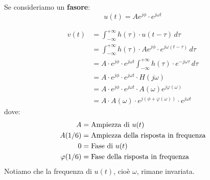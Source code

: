 \documentclass[a4paper]{article}
\begin{document}
\begin{example}
  Se consideriamo un \textbf{fasore}:
  \[
    u(t) = A e^{j \phi} \cdot  e^{j \omega t}
  \] 
  \begin{figure}[H]
    \centering
  \end{figure}
  \[
    \begin{aligned}
      v(t) &= \int_{- \infty}^{+ \infty} h(\tau) \cdot u(t - \tau) \,d\tau\\
           &= \int_{- \infty}^{+ \infty} h(\tau) \cdot A e^{j \phi} \cdot e^{j \omega (t - \tau)} \,d\tau\\
           &= A \cdot e^{j \phi} \cdot e^{j \omega t} \int_{- \infty}^{+ \infty} h(\tau) \cdot e^{-j \omega \tau} \,d\tau\\
           &= A \cdot e^{j \phi} \cdot e^{j \omega t} \cdot H(j \omega)\\
           &= A \cdot e^{j \phi} \cdot e^{j \omega t} \cdot A(\omega) e^{j \varphi (\omega)}\\
           &= A \cdot A(\omega) \cdot  e^{j \left( \phi + \varphi(\omega) \right) } \cdot e^{j \omega t}
    \end{aligned}
  \] 
  dove:
  \[
    \begin{aligned}
      A &= \text{Ampiezza di \( u(t) \)}\\
      A(\omega) &= \text{Ampiezza della risposta in frequenza}\\
      \phi &= \text{Fase di \( u(t) \)}\\
      \varphi(\omega) &= \text{Fase della risposta in frequenza}
    \end{aligned}
  \] 
  Notiamo che la frequenza di \( u(t) \), cioè \( \omega \), rimane invariata.
\end{example}
\end{document}
